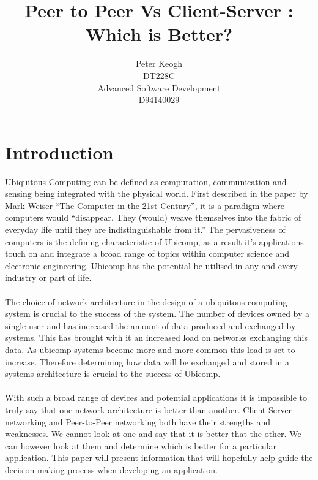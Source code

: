 \documentclass[11pt]{amsart}
\title{Peer to Peer Vs Client-Server : Which is Better?}
\author{
Peter Keogh
\\DT228C
\\Advanced Software Development
\\D94140029
}
\date{}
\begin{document}
\maketitle

\section{Introduction}

Ubiquitous Computing can be defined as computation, communication and sensing being integrated with the physical world. First described in the paper by Mark Weiser ``The Computer in the 21st Century'', it is a paradigm where computers would ``disappear. They (would) weave themselves into the fabric of everyday life until they are indistinguishable from it.''\cite{Weiser} The pervasiveness of computers is the defining characteristic of Ubicomp, as a result it's applications touch on and integrate a broad range of topics within computer science and electronic engineering. Ubicomp has the potential be utilised in any and every industry or part of life. 
\paragraph{}

The choice of network architecture in the design of a ubiquitous computing system is crucial to the success of the system. The number of devices owned by a single user and has increased the amount of data produced and exchanged by systems. This has brought with it an increased load on networks exchanging this data. As ubicomp systems become more and more common this load is set to increase. Therefore determining how data will be exchanged and stored in a systems architecture is crucial to the success of Ubicomp. 
\paragraph{}

With such a broad range of devices and potential applications it is impossible to truly say that one network architecture is better than another. Client-Server networking and Peer-to-Peer networking both have their strengths and weaknesses. We cannot look at one and say that it is better that the other. We can however look at them and determine which is better for a particular application. This paper will present information that will hopefully help guide the decision making process when developing an application.
\end{document}
